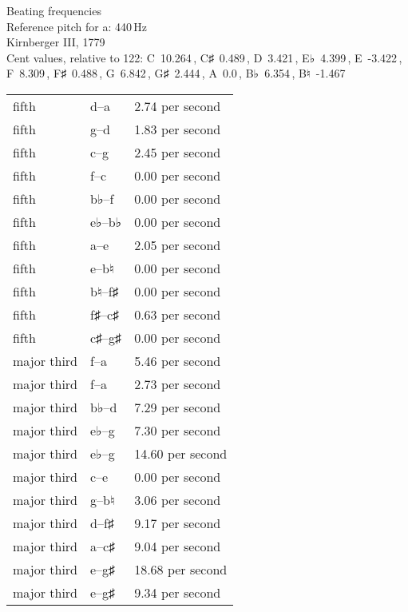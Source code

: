 \documentclass{standalone}
\def\str{\textquotesingle}
\def\cn{\textcent}
\begin{document}
\begin{minipage}{8cm}
\begin{center}
  {\Large Beating frequencies}\\[2ex]
  Reference pitch for a\str: 440\,Hz\\[1ex]
  Kirnberger III, 1779\\[1ex]
  Cent values, relative to 122: C~10.264\,\cn, C♯~0.489\,\cn, D~3.421\,\cn, E♭~4.399\,\cn, E~-3.422\,\cn, F~8.309\,\cn, F♯~0.488\,\cn, G~6.842\,\cn, G♯~2.444\,\cn, A~0.0\,\cn, B♭~6.354\,\cn, B♮~-1.467\,\cn
\end{center}
\begin{longtable}{p{2cm}p{1cm}p{3cm}}
  \toprule
  fifth & d\str--a\str & 2.74 per second \\fifth & g--d\str & 1.83 per second \\fifth & c\str--g\str & 2.45 per second \\fifth & f--c\str & 0.00 per second \\fifth & b♭--f\str & 0.00 per second \\fifth & e♭--b♭ & 0.00 per second \\fifth & a--e\str & 2.05 per second \\fifth & e--b♮ & 0.00 per second \\fifth & b♮--f♯\str & 0.00 per second \\fifth & f♯--c♯\str & 0.63 per second \\fifth & c♯\str--g♯\str & 0.00 per second \\major third & f\str--a\str & 5.46 per second \\major third & f--a & 2.73 per second \\major third & b♭--d\str & 7.29 per second \\major third & e♭--g & 7.30 per second \\major third & e♭\str--g\str & 14.60 per second \\major third & c\str--e\str & 0.00 per second \\major third & g--b♮ & 3.06 per second \\major third & d\str--f♯\str & 9.17 per second \\major third & a--c♯\str & 9.04 per second \\major third & e\str--g♯\str & 18.68 per second \\major third & e--g♯ & 9.34 per second \\
  \bottomrule
\end{longtable}
\end{minipage}
\end{document}
